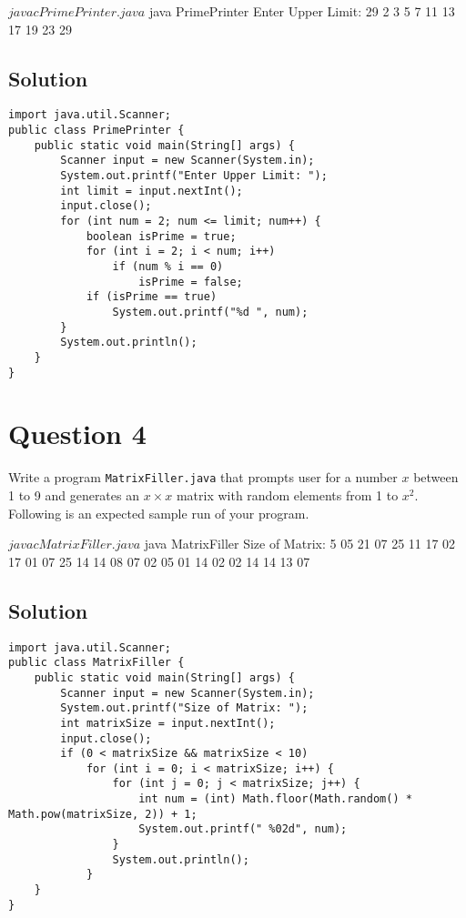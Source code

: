 \documentclass[12pt,letterpaper,twoside]{article}
\begin{document}
\begin{terminal}
$ javac PrimePrinter.java
$ java PrimePrinter
Enter Upper Limit: 29
2 3 5 7 11 13 17 19 23 29
\end{terminal}

\subsection*{Solution}

\lstset{language=Java,tabsize=2}
\begin{lstlisting}
import java.util.Scanner;
public class PrimePrinter {
	public static void main(String[] args) {
		Scanner input = new Scanner(System.in);
		System.out.printf("Enter Upper Limit: ");
		int limit = input.nextInt();
		input.close();
		for (int num = 2; num <= limit; num++) {
			boolean isPrime = true;
			for (int i = 2; i < num; i++)
				if (num % i == 0)
					isPrime = false;
			if (isPrime == true)
				System.out.printf("%d ", num);
		}
		System.out.println();
	}
}
\end{lstlisting}

\section*{Question 4}

Write a program \texttt{MatrixFiller.java} that prompts user for a number $x$ between 1 to 9 and generates an $x \times x$ matrix with random elements from 1 to $x^2$.
Following is an expected sample run of your program.

\begin{terminal}
$ javac MatrixFiller.java
$ java MatrixFiller
Size of Matrix: 5
 05 21 07 25 11
 17 02 17 01 07
 25 14 14 08 07
 02 05 01 14 02
 02 14 14 13 07
\end{terminal}

\subsection*{Solution}

\lstset{language=Java,tabsize=2}
\begin{lstlisting}
import java.util.Scanner;
public class MatrixFiller {
	public static void main(String[] args) {
		Scanner input = new Scanner(System.in);
		System.out.printf("Size of Matrix: ");
		int matrixSize = input.nextInt();
		input.close();
		if (0 < matrixSize && matrixSize < 10)
			for (int i = 0; i < matrixSize; i++) {
				for (int j = 0; j < matrixSize; j++) {
					int num = (int) Math.floor(Math.random() * Math.pow(matrixSize, 2)) + 1;
					System.out.printf(" %02d", num);
				}
				System.out.println();
			}
	}
}
\end{lstlisting}
\end{document}
